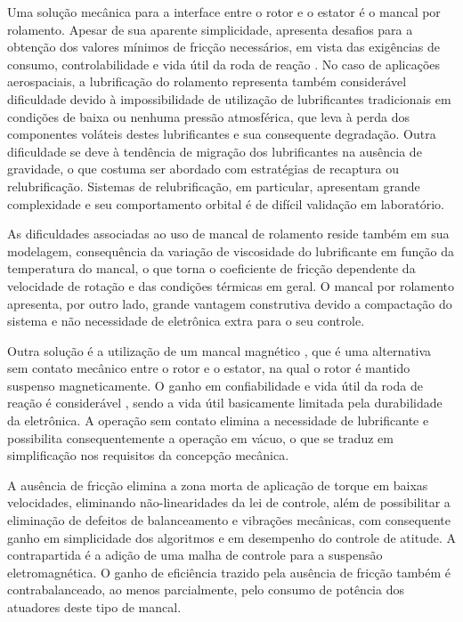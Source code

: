 Uma solução mecânica para a interface entre o rotor e o estator é o mancal por rolamento. Apesar de sua aparente simplicidade, apresenta desafios para a obtenção dos valores mínimos de fricção necessários, em vista das exigências de consumo, controlabilidade e vida útil da roda de reação \citep{Krishnan2010}. No caso de aplicações aerospaciais, a lubrificação do rolamento representa também considerável dificuldade devido à impossibilidade de utilização de lubrificantes tradicionais em condições de baixa ou nenhuma pressão atmosférica, que leva à perda dos componentes voláteis destes lubrificantes e sua consequente degradação. Outra dificuldade se deve à tendência de migração dos lubrificantes na ausência de gravidade, o que costuma ser abordado com estratégias de recaptura ou relubrificação. Sistemas de relubrificação, em particular, apresentam grande complexidade e seu comportamento orbital é de difícil validação em laboratório.

As dificuldades associadas ao uso de mancal de rolamento reside também em sua modelagem, consequência da variação de viscosidade do lubrificante em função da temperatura do mancal, o que torna o coeficiente de fricção dependente da velocidade de rotação e das condições térmicas em geral. O mancal por rolamento apresenta, por outro lado, grande vantagem construtiva devido a compactação do sistema e não necessidade de eletrônica extra para o seu controle. 

Outra solução é a utilização de um mancal magnético \citep{Bangcheng2012},  que é uma alternativa sem contato mecânico entre o rotor e o estator, na qual o rotor é mantido suspenso magneticamente. O ganho em confiabilidade e vida útil da roda de reação é considerável \citep{Marble2006}, sendo a vida útil basicamente limitada  pela durabilidade da eletrônica. A operação sem contato elimina a necessidade de lubrificante e possibilita consequentemente a operação em vácuo, o que se traduz em simplificação nos requisitos da concepção mecânica. 

A ausência de fricção elimina a zona morta de aplicação de torque em baixas velocidades, eliminando não-linearidades da lei de controle, além de possibilitar a eliminação de defeitos de balanceamento e vibrações mecânicas, com consequente ganho em simplicidade dos algoritmos e em desempenho do controle de atitude. A contrapartida é a adição de uma malha de controle para a suspensão eletromagnética. O ganho de eficiência trazido pela ausência de fricção também é contrabalanceado, ao menos parcialmente, pelo consumo de potência dos atuadores deste tipo de mancal.

